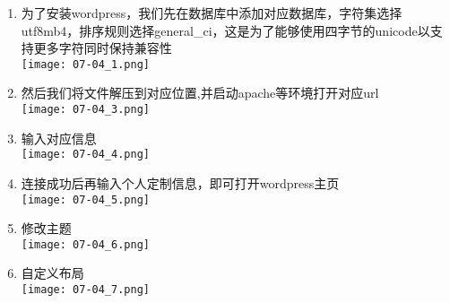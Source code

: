 \documentclass[UTF8]{ctexart}
\begin{document}
    \begin{enumerate}
        \item 
        为了安装wordpress，我们先在数据库中添加对应数据库，字符集选择utf8mb4，排序规则选择general\_ci，这是为了能够使用四字节的unicode以支持更多字符同时保持兼容性\\
        \texttt{[image: 07-04\_1.png]}\\
        \item 然后我们将文件解压到对应位置,并启动apache等环境打开对应url\\
        \texttt{[image: 07-04\_3.png]}\\
        \item 输入对应信息\\
        \texttt{[image: 07-04\_4.png]}\\
        \item 连接成功后再输入个人定制信息，即可打开wordpress主页\\
        \texttt{[image: 07-04\_5.png]}\\
        \item 修改主题\\
        \texttt{[image: 07-04\_6.png]}\\
        \item 自定义布局\\
        \texttt{[image: 07-04\_7.png]}\\
    \end{enumerate}
\end{document}
